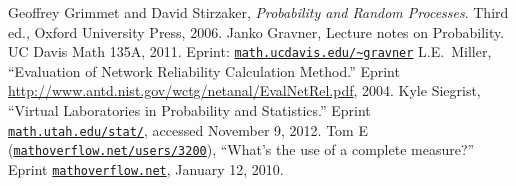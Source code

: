 \begin{thebibliography}{99}\small
{}
Geoffrey Grimmet and David Stirzaker,\newblock
\emph{Probability and Random Processes}.\newblock
Third ed., Oxford University Press, 2006.
Janko Gravner,\newblock
Lecture notes on Probability.\newblock
UC Davis Math 135A, 2011. Eprint: \href{http://www.math.ucdavis.edu/~gravner/MAT135A/resources/lecturenotes.pdf}{\nolinkurl{math.ucdavis.edu/~gravner}}
L.E.~Miller,\newblock
``Evaluation of Network Reliability Calculation Method.''\newblock
Eprint \url{http://www.antd.nist.gov/wctg/netanal/EvalNetRel.pdf}, 2004.
Kyle Siegrist,\newblock
``Virtual Laboratories in Probability and Statistics.''\newblock
Eprint \href{http://www.math.uah.edu/stat/index.html}{\tt math.utah.edu/stat/}, accessed November
9, 2012.
 Tom E (\href{http://mathoverflow.net/users/3200/tom-e}{\tt mathoverflow.net/users/3200}),\newblock 
``What's the use of a complete measure?''\newblock
Eprint \href{http://mathoverflow.net/questions/11554}{\tt mathoverflow.net}, January 12, 2010.
\end{thebibliography}
